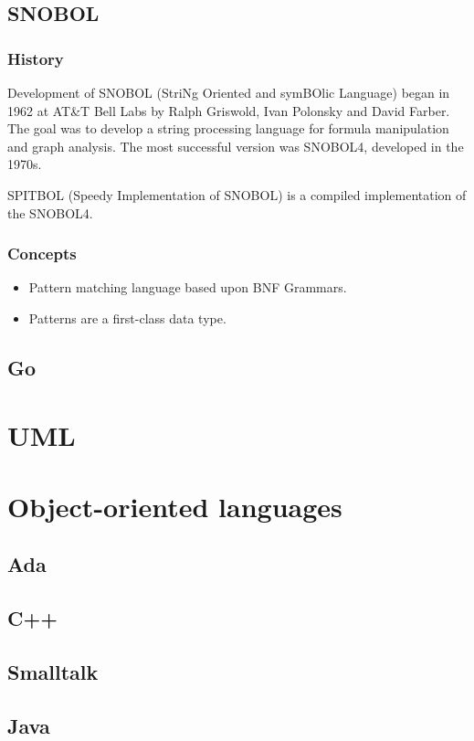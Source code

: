 \subsection{SNOBOL}
\subsubsection{History}
Development of SNOBOL (StriNg Oriented and symBOlic Language) began in 1962 at AT\&T Bell Labs by Ralph Griswold, Ivan Polonsky and David Farber. The goal was to develop a string processing language for formula manipulation and graph analysis. The most successful version was SNOBOL4, developed in the 1970s.

SPITBOL (Speedy Implementation of SNOBOL) is a compiled implementation of the SNOBOL4.
\subsubsection{Concepts}
\begin{itemize}
\item Pattern matching language based upon BNF Grammars.
\item Patterns are a first-class data type.
\end{itemize}
\subsection{Go}

\section{UML}


\section{Object-oriented languages}
\subsection{Ada}
\subsection{C++}
\subsection{Smalltalk}
\subsection{Java}
